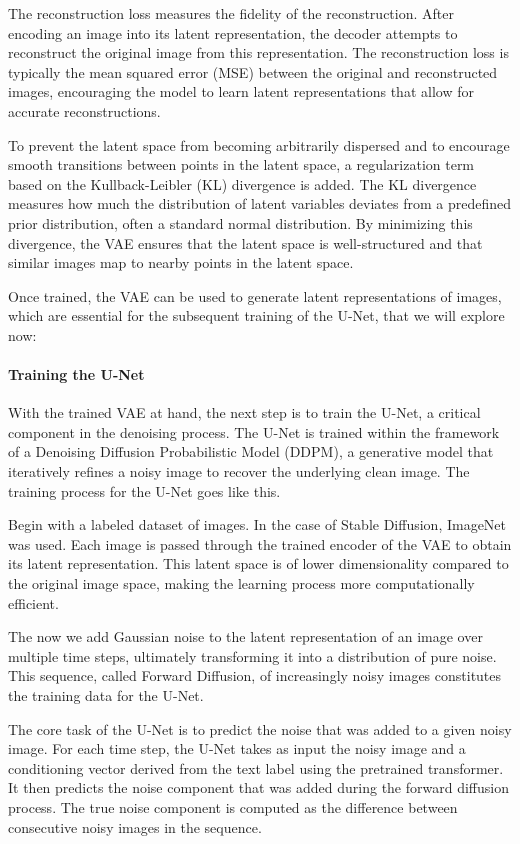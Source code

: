 \documentclass[11pt]{article}
\begin{document}
The reconstruction loss measures the fidelity of the reconstruction. After encoding an image into its latent representation, the decoder attempts to reconstruct the original image from this representation. The reconstruction loss is typically the mean squared error (MSE) between the original and reconstructed images, encouraging the model to learn latent representations that allow for accurate reconstructions.

To prevent the latent space from becoming arbitrarily dispersed and to encourage smooth transitions between points in the latent space, a regularization term based on the Kullback-Leibler (KL) divergence is added. The KL divergence measures how much the distribution of latent variables deviates from a predefined prior distribution, often a standard normal distribution. By minimizing this divergence, the VAE ensures that the latent space is well-structured and that similar images map to nearby points in the latent space.

Once trained, the VAE can be used to generate latent representations of images, which are essential for the subsequent training of the U-Net, that we will explore now:

\paragraph{Training the U-Net}
With the trained VAE at hand, the next step is to train the U-Net, a critical component in the denoising process. The U-Net is trained within the framework of a Denoising Diffusion Probabilistic Model (DDPM)\cite{ho2020denoisingdiffusionprobabilisticmodels}, a generative model that iteratively refines a noisy image to recover the underlying clean image. The training process for the U-Net goes like this.

Begin with a labeled dataset of images. In the case of Stable Diffusion, ImageNet\cite{deng2009imagenet} was used. Each image is passed through the trained encoder of the VAE to obtain its latent representation. This latent space is of lower dimensionality compared to the original image space, making the learning process more computationally efficient.

The now we add Gaussian noise to the latent representation of an image over multiple time steps, ultimately transforming it into a distribution of pure noise. This sequence, called Forward Diffusion, of increasingly noisy images constitutes the training data for the U-Net.

The core task of the U-Net is to predict the noise that was added to a given noisy image. For each time step, the U-Net takes as input the noisy image and a conditioning vector derived from the text label using the pretrained transformer. It then predicts the noise component that was added during the forward diffusion process. The true noise component is computed as the difference between consecutive noisy images in the sequence.
\end{document}

